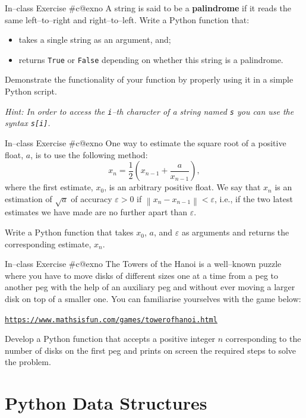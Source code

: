 \documentclass[aspectratio=169, 12pt, xcolor=table]{beamer}
\makeatletter
\newcommand{\ohref}[1]{\href{#1}{\texttt{#1}}}
\newcommand{\arabicthree}[1]{\expandafter\@arabicthree\csname c@#1\endcsname}
\newcommand{\@arabicthree}[1]{\ifnum #1<100 0\fi\ifnum #1<10 0\fi\number#1}
\newcounter{exno}
\newcommand{\exno}{\stepcounter{exno}In--class Exercise \#\arabicthree{exno}}
\makeatother
\begin{document}
	\begin{frame}{\exno}
		A string is said to be a \textbf{palindrome} if it reads the same left--to--right and right--to--left. Write a Python function that:
		\begin{itemize}
			\item takes a single string as an argument, and;
			\item returns \texttt{True} or \texttt{False} depending on whether this string is a palindrome.
		\end{itemize}
		Demonstrate the functionality of your function by properly using it in a simple Python script.
		
		\textit{Hint: In order to access the \texttt{i}--th character of a string named \texttt{s} you can use the syntax \texttt{s[i]}.}
	\end{frame}
	
	\begin{frame}{\exno}
		One way to estimate the square root of a positive float, $a$, is to use the following method:
		\[x_n=\frac{1}{2}\left(x_{n-1}+\frac{a}{x_{n-1}}\right),\]
		where the first estimate, $x_0$, is an arbitrary positive float. We say that $x_n$ is an estimation of $\sqrt{a}$ of accuracy $\varepsilon>0$ if $\left\lVert x_n-x_{n-1}\right\rVert<\varepsilon$, i.e., if the two latest estimates we have made are no further apart than $\varepsilon$.
		
		Write a Python function that takes $x_0$, $a$, and $\varepsilon$ as arguments and returns the corresponding estimate, $x_n$.
	\end{frame}
	
	\begin{frame}{\exno}
		The Towers of the Hanoi is a well--known puzzle where you have to move disks of different sizes one at a time from a peg to another peg with the help of an auxiliary peg and without ever moving a larger disk on top of a smaller one. You can familiarise yourselves with the game below:
		\begin{center}
			\ohref{https://www.mathsisfun.com/games/towerofhanoi.html}
		\end{center}
		Develop a Python function that accepts a positive integer $n$ corresponding to the number of disks on the first peg and prints on screen the required steps to solve the problem.
	\end{frame}

	\section{Python Data Structures}\label{sec:python-data-structures}
	
\end{document}
